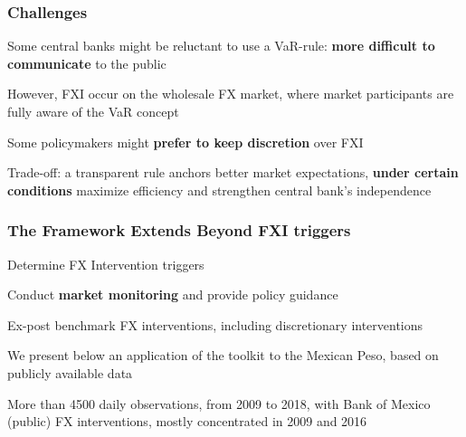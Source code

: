 \documentclass{beamer}
\newenvironment{wideitemize}{\itemize\addtolength{\itemsep}{10pt}}{\enditemize}
\newenvironment{wideenumerate}{\enumerate\addtolength{\itemsep}{10pt}}{\endenumerate}
\begin{document}
\begin{frame}
  \frametitle{Challenges}
  \begin{wideitemize}
      \item Some central banks might be reluctant to use a VaR-rule: \textbf{more
        difficult to communicate} to the public
        \begin{wideitemize}
      \item However, FXI occur on the wholesale FX market, where market
        participants are fully aware of the VaR concept
        \end{wideitemize}        
      \item Some policymakers might \textbf{prefer to keep discretion} over FXI
        \begin{wideitemize}
    \item Trade-off: a transparent rule anchors better market expectations,
      \textbf{under certain conditions }maximize efficiency  and strengthen central bank's independence
        \end{wideitemize}        
  \end{wideitemize}
\end{frame}

\begin{frame}
  \frametitle{The Framework Extends Beyond FXI triggers}    
  \begin{wideenumerate}
    \item Determine FX Intervention triggers
    \item Conduct \textbf{market monitoring} and provide policy guidance
    \item Ex-post benchmark FX interventions, including discretionary interventions
    \end{wideenumerate}
    
    \bigskip
    
  \begin{wideitemize}
    \item We present below an application of the toolkit to the Mexican Peso, based on publicly
      available data
    \item More than 4500 daily observations, from 2009 to 2018, with Bank of
      Mexico (public) FX interventions, mostly concentrated in 2009 and 2016
    \end{wideitemize}
    
\end{frame}


\end{document}
